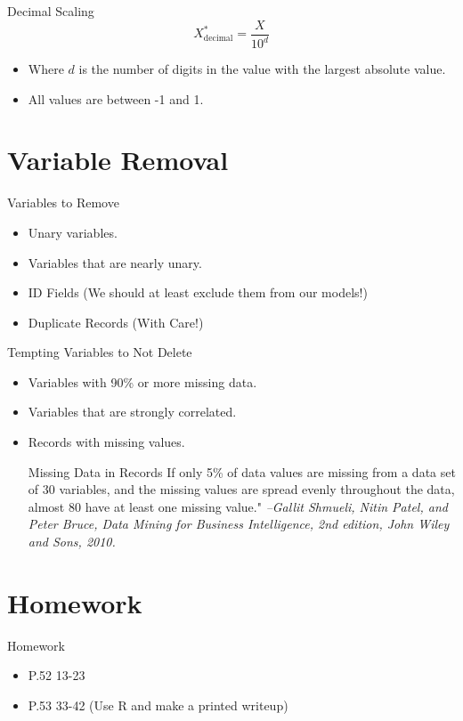 \documentclass[handout]{beamer}
\begin{document}
\begin{frame}{Decimal Scaling}
\[
X^*_{\mathrm{decimal}} = \displaystyle\frac{X}{10^d}
\]

\begin{itemize}[<+->]
  \item Where $d$ is the number of digits in the value with the largest absolute value.
  \item All values are between -1 and 1.
\end{itemize}
\end{frame}


\section{Variable Removal}
\begin{frame}{Variables to Remove}
  \begin{itemize}[<+->]
    \item Unary variables.
    \item Variables that are nearly unary.
    \item ID Fields (We should at least exclude them from our models!)
    \item Duplicate Records (With Care!)
  \end{itemize}
\end{frame}

\begin{frame}{Tempting Variables to Not Delete}
  \begin{itemize}[<+->]
  \item Variables with 90\% or more missing data.
  \item Variables that are strongly correlated.
  \item Records with missing values.
  \begin{block}{Missing Data in Records}
    If only 5\% of data values are missing
    from a data set of 30 variables, and the missing values are
    spread evenly throughout the data, almost 80%
    have at least one missing value."
    {\tiny \em --Gallit Shmueli, Nitin Patel, and Peter Bruce, Data Mining for
      Business Intelligence, 2nd edition, John Wiley and Sons, 2010. }
  \end{block}
    \end{itemize}
\end{frame}


\section{Homework}
\begin{frame}{Homework}
  \begin{itemize}
    \item P.52 13-23
    \item P.53 33-42 (Use R and make a printed writeup)
  \end{itemize}
\end{frame}
\end{document}
